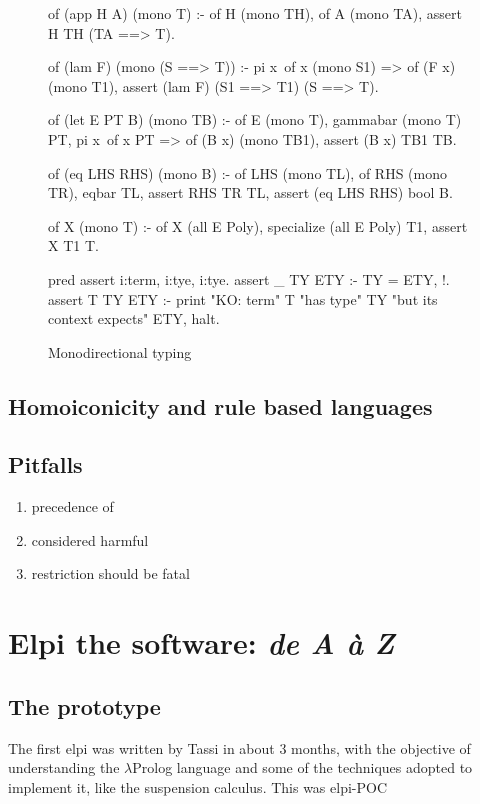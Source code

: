 \documentclass[a4paper, 11pt]{book}
\begin{document}
\begin{figure}
\begin{elpicode}
of (app H A) (mono T) :-
  of H (mono TH),
  of A (mono TA),
  assert H TH (TA ==> T).

of (lam F) (mono (S ==> T)) :-
  pi x\ of x (mono S1) => of (F x) (mono T1),
  assert (lam F) (S1 ==> T1) (S ==> T).

of (let E PT B) (mono TB) :-
  of E (mono T),
  gammabar (mono T) PT,
  pi x\ of x PT => of (B x) (mono TB1),
  assert (B x) TB1 TB.

of (eq LHS RHS) (mono B) :-
  of LHS (mono TL),
  of RHS (mono TR),
  eqbar TL,
  assert RHS TR TL,
  assert (eq LHS RHS) bool B.

of X (mono T) :- of X (all E Poly), specialize (all E Poly) T1, assert X T1 T.

pred assert i:term, i:tye, i:tye.
assert _ TY ETY :- TY = ETY, !.
assert T TY ETY :-
  print "KO: term" T "has type" TY "but its context expects" ETY, halt.
\end{elpicode}
\caption[monodirectional]{Monodirectional typing\label{hm:mono}}
\end{figure}

\section{Homoiconicity and rule based languages}

\section{Pitfalls}

\begin{enumerate}
  \item precedence of \elpiinline{=>}
  \item {} considered harmful
  \item restriction should be fatal
\end{enumerate}

\chapter{Elpi the software: \emph{de A \`a Z}}

\section{The prototype}

The first elpi was written by Tassi in about 3 months, with the objective
of understanding the $\lambda$Prolog language and some of the techniques
adopted to implement it, like the suspension calculus. This was elpi-POC
\end{document}
